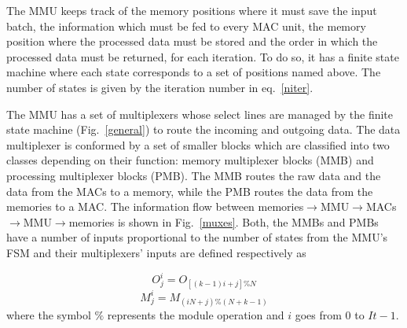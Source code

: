 \documentclass[conference,compsoc]{IEEEtran}
\begin{document}
The MMU keeps track of the memory positions where it must save the input batch,
the information which must be fed to every MAC unit, the memory position where
the processed data must be stored and the order in which the processed data must
be returned, for each iteration. To do so, it has a finite state machine where
each state corresponds to a set of positions named above. The number of states
is given by the iteration number in eq.~\ref{niter}.

The MMU has a set of multiplexers whose select lines are managed by the finite
state machine (Fig.~\ref{general}) to route the incoming and outgoing data. The
data multiplexer is conformed by a set of smaller blocks which are classified
into two classes depending on their function: memory multiplexer blocks (MMB)
and processing multiplexer blocks (PMB). The MMB routes the raw data and the
data from the MACs to a memory, while the PMB routes the data from the memories
to a MAC. The information flow between
memories$\rightarrow$MMU$\rightarrow$MACs$\rightarrow$MMU$\rightarrow$memories
is shown in Fig.~\ref{muxes}. Both, the MMBs and PMBs have a number of inputs
proportional to the number of states from the MMU's FSM and their multiplexers'
inputs are defined respectively as

\begin{equation}%
  O_j^i = O_{[(k-1)i+j]\%N}
\end{equation}
\begin{equation}%
  M_j^i = M_{(iN+j)\%(N+k-1)}
\end{equation}
where the symbol $\%$ represents the module operation and $i$ goes from $0$ to $It-1$.
\end{document}
